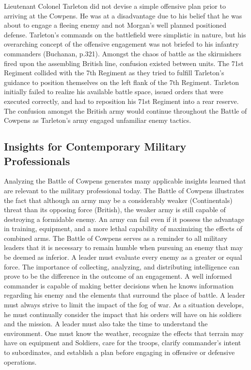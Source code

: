 Lieutenant Colonel Tarleton did not devise a simple offensive plan prior to
arriving at the Cowpens.  He was at a disadvantage due to his belief that he
was about to engage a fleeing enemy and not Morgan’s well planned positioned
defense.  Tarleton’s commands on the battlefield were simplistic in nature, but
his overarching concept of the offensive engagement was not briefed to his
infantry commanders (Buchanan, p.321).  Amongst the chaos of battle as the
skirmishers fired upon the assembling British line, confusion existed between
units.  The 71st Regiment collided with the 7th Regiment as they tried to
fulfill Tarleton’s guidance to position themselves on the left flank of the 7th
Regiment.  Tarleton initially failed to realize his available battle space,
issued orders that were executed correctly, and had to reposition his 71st
Regiment into a rear reserve.   The confusion amongst the British army would
continue throughout the Battle of Cowpens as Tarleton’s army engaged unfamiliar
enemy tactics.  

\subsection{Insights for Contemporary Military Professionals}

Analyzing the Battle of Cowpens generates many applicable insights learned that
are relevant to the military professional today.  The Battle of Cowpens
illustrates the fact that although an army may be a considerably weaker
(Continentals) threat than its opposing force (British), the weaker army is
still capable of destroying a formidable enemy.  An army can fail even if it
possess the advantage in training, equipment, and a more lethal capability of
maximizing the effects of combined arms.  The Battle of Cowpens serves as a
reminder to all military leaders that it is necessary to remain humble when
pursuing an enemy that may be deemed as inferior.    A leader must evaluate
every enemy as a greater or equal force.  The importance of collecting,
analyzing, and distributing intelligence can prove to be the difference in the
outcome of an engagement.  A well informed commander is capable of making
better decisions when he knows information regarding his enemy and the elements
that surround the place of battle.  A leader must always strive to limit the
impact of the fog of war.  As a situation develops, he must continually
consider the impact that his orders will have on his soldiers and the mission.
A leader must also take the time to understand the environment.  One must know
the weather, recognize the effects that terrain may have on equipment and
Soldiers, care for the troops, clarify commander’s intent to subordinates, and
establish a plan before engaging in offensive or defensive operations.


